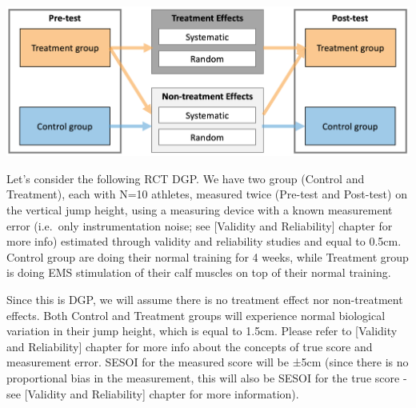 \documentclass[
]{book}
\begin{document}
\begin{center}\includegraphics[width=1\linewidth]{figures/treatment-and-non-treatment-effects} \end{center}

Let's consider the following RCT DGP. We have two group (Control and Treatment), each with N=10 athletes, measured twice (Pre-test and Post-test) on the vertical jump height, using a measuring device with a known measurement error (i.e.~only instrumentation noise; see {[}Validity and Reliability{]} chapter for more info) estimated through validity and reliability studies and equal to 0.5cm. Control group are doing their normal training for 4 weeks, while Treatment group is doing EMS stimulation of their calf muscles on top of their normal training.

Since this is DGP, we will assume there is no treatment effect nor non-treatment effects. Both Control and Treatment groups will experience normal biological variation in their jump height, which is equal to 1.5cm. Please refer to {[}Validity and Reliability{]} chapter for more info about the concepts of true score and measurement error. SESOI for the measured score will be ±5cm (since there is no proportional bias in the measurement, this will also be SESOI for the true score - see {[}Validity and Reliability{]} chapter for more information).
\end{document}
